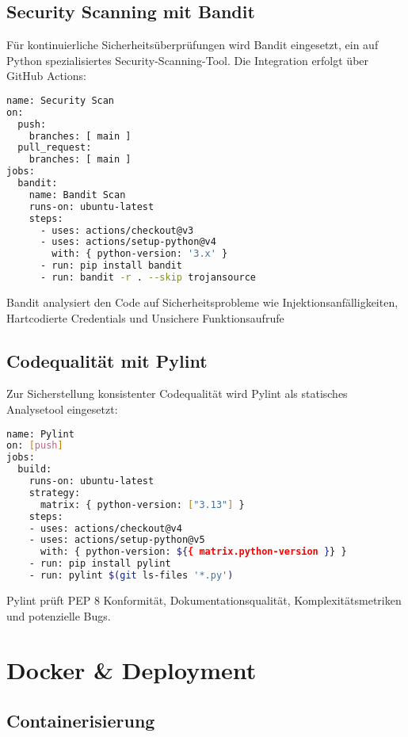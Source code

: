 \documentclass[12pt]{scrreprt}
\begin{document}
\section{Security Scanning mit Bandit}

Für kontinuierliche Sicherheitsüberprüfungen wird Bandit eingesetzt, ein auf Python spezialisiertes Security-Scanning-Tool. Die Integration erfolgt über GitHub Actions:

\begin{lstlisting}[language= Bash]
name: Security Scan
on:
  push:
    branches: [ main ]
  pull_request:
    branches: [ main ]
jobs:
  bandit:
    name: Bandit Scan
    runs-on: ubuntu-latest
    steps:
      - uses: actions/checkout@v3
      - uses: actions/setup-python@v4
        with: { python-version: '3.x' }
      - run: pip install bandit
      - run: bandit -r . --skip trojansource
\end{lstlisting}

Bandit analysiert den Code auf Sicherheitsprobleme wie Injektionsanfälligkeiten, Hartcodierte Credentials und Unsichere Funktionsaufrufe


\section{Codequalität mit Pylint}

Zur Sicherstellung konsistenter Codequalität wird Pylint als statisches Analysetool eingesetzt:

\begin{lstlisting}[language= Bash]
name: Pylint
on: [push]
jobs:
  build:
    runs-on: ubuntu-latest
    strategy:
      matrix: { python-version: ["3.13"] }
    steps:
    - uses: actions/checkout@v4
    - uses: actions/setup-python@v5
      with: { python-version: ${{ matrix.python-version }} }
    - run: pip install pylint
    - run: pylint $(git ls-files '*.py')
\end{lstlisting}

Pylint prüft PEP 8 Konformität, Dokumentationsqualität, Komplexitätsmetriken und potenzielle Bugs.

\chapter{Docker \& Deployment}

\section{Containerisierung}
\end{document}
